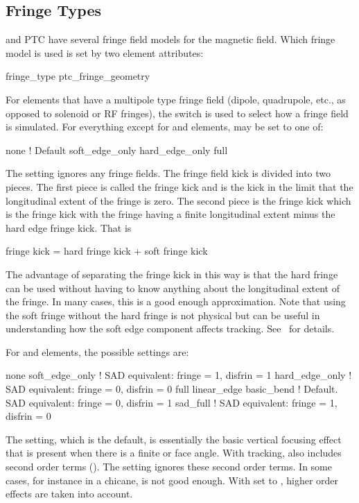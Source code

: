 {%
\subsection{Fringe Types}
\label{s:fringe.trype}

\bmad and PTC have several fringe field models for the magnetic field. Which fringe
model is used is set by two element attributes:
\begin{example}
  fringe_type
  ptc_fringe_geometry
\end{example}

For elements that have a multipole type fringe field (dipole, quadrupole, etc., as opposed to
solenoid or RF fringes), the  switch is used to select how a fringe field is
simulated.  For everything except for  and  elements,  may be
set to one of:
\begin{example}
  none              ! Default 
  soft_edge_only
  hard_edge_only
  full
\end{example}
The  setting ignores any fringe fields.  The fringe field kick is divided into two pieces.
The first piece is called the  fringe kick and is the kick in the limit that the
longitudinal extent of the fringe is zero. The second piece is the  fringe kick which
is the fringe kick with the fringe having a finite longitudinal extent minus the hard edge fringe
kick. That is
\begin{example}
  fringe kick = hard fringe kick + soft fringe kick
\end{example}
The advantage of separating the fringe kick in this way is that the hard fringe can be used without
having to know anything about the longitudinal extent of the fringe.  In many cases, this is a good
enough approximation. Note that using the soft fringe without the hard fringe is not physical but
can be useful in understanding how the soft edge component affects tracking. See~
for details.

For  and  elements, the possible 
settings are:
\begin{example}
  none
  soft_edge_only      !          SAD equivalent: fringe = 1, disfrin = 1
  hard_edge_only      !          SAD equivalent: fringe = 0, disfrin = 0
  full
  linear_edge
  basic_bend          ! Default. SAD equivalent: fringe = 0, disfrin = 1
  sad_full            !          SAD equivalent: fringe = 1, disfrin = 0
\end{example}
The  setting, which is the default, is essentially the basic vertical focusing effect
that is present when there is a finite  or  face angle. With 
tracking,  also includes second order terms (). The
 setting ignores these second order terms.  In some cases, for instance in a
chicane,  is not good enough. With  set to , higher order
effects are taken into account.

}

